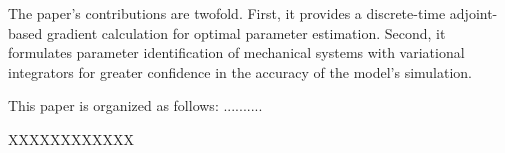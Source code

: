 \documentclass[letterpaper, 10pt, conference]{ieeeconf}
\begin{document}
The paper's contributions are twofold.  First, it provides a discrete-time adjoint-based gradient calculation for optimal parameter estimation.  Second, it formulates parameter identification of mechanical systems with variational integrators for greater confidence in the accuracy of the model's simulation.

This paper is organized as follows: ..........


XXXXXXXXXXXX







\end{document}
